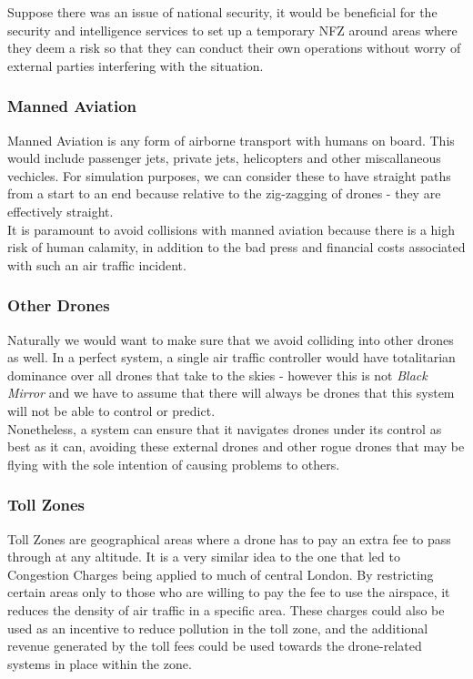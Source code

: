 \documentclass[a4paper,12pt,titlepage]{article}
\begin{document}
Suppose there was an issue of national security, it would be beneficial for the security and intelligence services to set up a temporary NFZ around areas where they deem a risk so that they can conduct their own operations without worry of external parties interfering with the situation.

\subsubsection{Manned Aviation}
Manned Aviation is any form of airborne transport with humans on board. This would include passenger jets, private jets, helicopters and other miscallaneous vechicles. For simulation purposes, we can consider these to have straight paths from a start to an end because relative to the zig-zagging of drones - they are effectively straight. \\

It is paramount to avoid collisions with manned aviation because there is a high risk of human calamity, in addition to the bad press and financial costs associated with such an air traffic incident.

\subsubsection{Other Drones}
Naturally we would want to make sure that we avoid colliding into other drones as well. In a perfect system, a single air traffic controller would have totalitarian dominance over all drones that take to the skies - however this is not \textit{Black Mirror} and we have to assume that there will always be drones that this system will not be able to control or predict. \\

Nonetheless, a system can ensure that it navigates drones under its control as best as it can, avoiding these external drones and other rogue drones that may be flying with the sole intention of causing problems to others.

\subsubsection{Toll Zones}
Toll Zones are geographical areas where a drone has to pay an extra fee to pass through at any altitude. It is a very similar idea to the one that led to Congestion Charges being applied to much of central London. By restricting certain areas only to those who are willing to pay the fee to use the airspace, it reduces the density of air traffic in a specific area. These charges could also be used as an incentive to reduce pollution in the toll zone, and the additional revenue generated by the toll fees could be used towards the drone-related systems in place within the zone.
\end{document}
